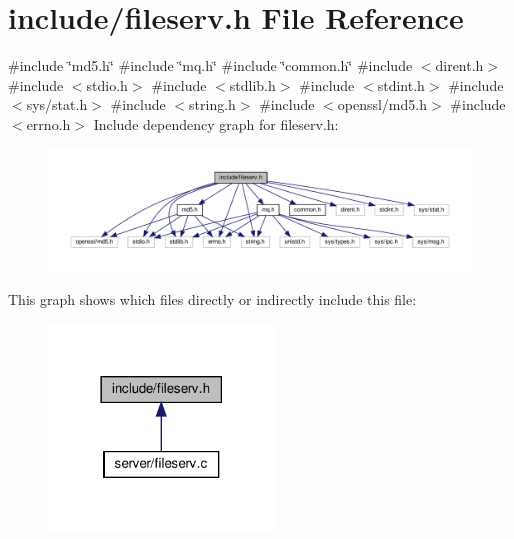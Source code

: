 \section{include/fileserv.h File Reference}
\label{fileserv_8h}
{\ttfamily \#include \char`\"{}md5.\+h\char`\"{}}\newline
{\ttfamily \#include \char`\"{}mq.\+h\char`\"{}}\newline
{\ttfamily \#include \char`\"{}common.\+h\char`\"{}}\newline
{\ttfamily \#include $<$dirent.\+h$>$}\newline
{\ttfamily \#include $<$stdio.\+h$>$}\newline
{\ttfamily \#include $<$stdlib.\+h$>$}\newline
{\ttfamily \#include $<$stdint.\+h$>$}\newline
{\ttfamily \#include $<$sys/stat.\+h$>$}\newline
{\ttfamily \#include $<$string.\+h$>$}\newline
{\ttfamily \#include $<$openssl/md5.\+h$>$}\newline
{\ttfamily \#include $<$errno.\+h$>$}\newline
Include dependency graph for fileserv.\+h\+:
\nopagebreak
\begin{figure}[H]
\begin{center}
\leavevmode
\includegraphics[width=350pt]{fileserv_8h__incl}
\end{center}
\end{figure}
This graph shows which files directly or indirectly include this file\+:
\nopagebreak
\begin{figure}[H]
\begin{center}
\leavevmode
\includegraphics[width=170pt]{fileserv_8h__dep__incl}
\end{center}
\end{figure}
